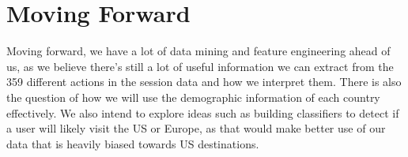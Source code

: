 \documentclass[a4paper, 11pt]{article}
\begin{document}
\section*{Moving Forward}
\par
Moving forward, we have a lot of data mining and feature engineering ahead of us, as we believe there’s still a lot of useful information we can extract from the 359 different actions in the session data and how we interpret them. There is also the question of how we will use the demographic information of each country effectively. We also intend to explore ideas such as building classifiers to detect if a user will likely visit the US or Europe, as that would make better use of our data that is heavily biased towards US destinations.
\end{document}
